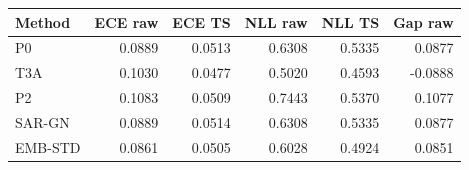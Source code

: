 \begin{tabular}{lrrrrr}
\toprule
Method & ECE raw & ECE TS & NLL raw & NLL TS & Gap raw \\
\midrule
P0 & 0.0889 & 0.0513 & 0.6308 & 0.5335 & 0.0877 \\
T3A & 0.1030 & 0.0477 & 0.5020 & 0.4593 & -0.0888 \\
P2 & 0.1083 & 0.0509 & 0.7443 & 0.5370 & 0.1077 \\
SAR-GN & 0.0889 & 0.0514 & 0.6308 & 0.5335 & 0.0877 \\
EMB-STD & 0.0861 & 0.0505 & 0.6028 & 0.4924 & 0.0851 \\
\bottomrule\end{tabular}
